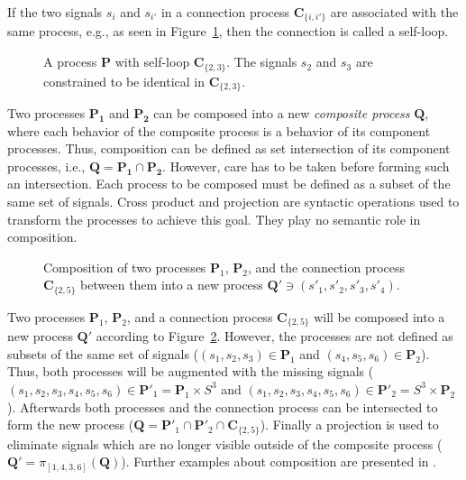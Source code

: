 If the two signals $s_i$ and $s_{i'}$ in a connection process $\mathbf{C}_{\{i,i'\}}$ are
associated with the same process, e.g., as seen in Figure~\ref{fig:example-self-loop},
then the connection is called a self-loop.

\begin{figure}[htb]
\centering

\caption{A process $\mathbf{P}$ with self-loop $\mathbf{C}_{\{2,3\}}$.
         The signals $s_2$ and $s_3$ are constrained to be identical in
         $\mathbf{C}_{\{2,3\}}$.\label{fig:example-self-loop}}
\end{figure}

Two processes $\mathbf{P_1}$ and $\mathbf{P_2}$ can be composed into
a new \emph{composite process} $\mathbf{Q}$, where
each behavior of the composite process is a behavior of its
component processes. Thus, composition can be defined as set intersection of
its component processes, i.e., $\mathbf{Q} = \mathbf{P_1} \cap \mathbf{P_2}$.
However, care has to be taken before forming such an intersection.
Each process to be composed must be defined as a subset of the same
set of signals.
Cross product and projection are syntactic operations
used to transform the processes to achieve this goal. They play no
semantic role in composition.

\begin{figure}[htb]
\centering

\caption{Composition of two processes $\mathbf{P}_1$, $\mathbf{P}_2$,
         and the connection process $\mathbf{C}_{\{2,5\}}$ between them
         into a new process $\mathbf{Q}' \ni (s'_1,s'_2,s'_3,s'_4)$.
         \label{fig:example-tsm-composition}}
\end{figure}

\begin{example}
Two processes $\mathbf{P}_1$, $\mathbf{P}_2$, and a connection process
$\mathbf{C}_{\{2,5\}}$ will be composed into a new process $\mathbf{Q}'$ according to
Figure~\ref{fig:example-tsm-composition}. However, the processes are
not defined as subsets of the same set of signals
($(s_1,s_2,s_3) \in \mathbf{P}_1$ and $(s_4,s_5,s_6) \in \mathbf{P}_2$).
Thus, both processes will be augmented with the missing signals
($(s_1,s_2,s_3,s_4,s_5,s_6) \in \mathbf{P}'_1 = \mathbf{P}_1 \times S^3$ and
 $(s_1,s_2,s_3,s_4,s_5,s_6) \in \mathbf{P}'_2 = S^3 \times \mathbf{P}_2$).
Afterwards both processes and the connection process can be intersected to form
the new process ($\mathbf{Q} = \mathbf{P}'_1 \cap \mathbf{P}'_2 \cap \mathbf{C}_{\{2,5\}}$).
Finally a projection is used to eliminate signals which are no longer
visible outside of the composite process ($\mathbf{Q}' = \pi{}_{[1,4,3,6]}(\mathbf{Q})$).
Further examples about composition are presented in \cite{Lee98}.
\end{example}

